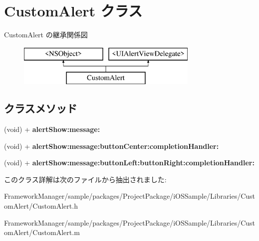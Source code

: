 \hypertarget{interface_custom_alert}{}\section{Custom\+Alert クラス}
\label{interface_custom_alert}
Custom\+Alert の継承関係図\begin{figure}[H]
\begin{center}
\leavevmode
\includegraphics[height=2.000000cm]{interface_custom_alert}
\end{center}
\end{figure}
\subsection*{クラスメソッド}
\begin{DoxyCompactItemize}
\item 
\hypertarget{interface_custom_alert_ade98c0c77f9a530d3de6d544f0ae1c73}{}(void) + {\bfseries alert\+Show\+:message\+:}\label{interface_custom_alert_ade98c0c77f9a530d3de6d544f0ae1c73}

\item 
\hypertarget{interface_custom_alert_a88aeb1b546ad38374ceeadb75ec8e091}{}(void) + {\bfseries alert\+Show\+:message\+:button\+Center\+:completion\+Handler\+:}\label{interface_custom_alert_a88aeb1b546ad38374ceeadb75ec8e091}

\item 
\hypertarget{interface_custom_alert_ae754701daf38d0705a023d2947933259}{}(void) + {\bfseries alert\+Show\+:message\+:button\+Left\+:button\+Right\+:completion\+Handler\+:}\label{interface_custom_alert_ae754701daf38d0705a023d2947933259}

\end{DoxyCompactItemize}


このクラス詳解は次のファイルから抽出されました\+:\begin{DoxyCompactItemize}
\item 
Framework\+Manager/sample/packages/\+Project\+Package/i\+O\+S\+Sample/\+Libraries/\+Custom\+Alert/Custom\+Alert.\+h\item 
Framework\+Manager/sample/packages/\+Project\+Package/i\+O\+S\+Sample/\+Libraries/\+Custom\+Alert/Custom\+Alert.\+m\end{DoxyCompactItemize}
